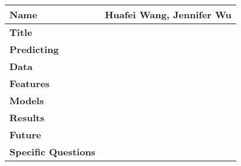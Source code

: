 \documentclass{cs229report}
\begin{document}
\renewcommand{\arraystretch}{2.0}
\begin{tabular}[]{|l|l|}
  \hline
  \textbf{Name} & Huafei Wang, Jennifer Wu \\ \hline
  \textbf{Title} & \\ \hline
  \textbf{Predicting} & \\ \hline
  \textbf{Data} & \\ \hline
  \textbf{Features} & \\ \hline
  \textbf{Models} & \\ \hline
  \textbf{Results} & \\ \hline
  \textbf{Future} & \\ \hline
  \textbf{Specific Questions} & \\ \hline
\end{tabular}
\end{document}
